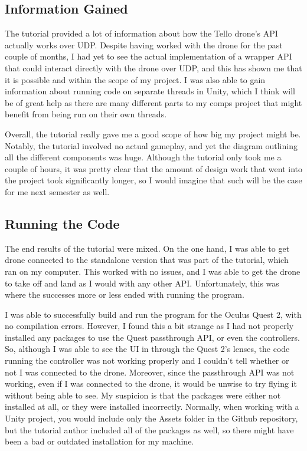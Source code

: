 \documentclass[10pt,twocolumn]{article}
\begin{document}
\subsection{Information Gained}
The tutorial provided a lot of information about how the Tello drone's API actually works over UDP. Despite having worked with the drone for the past couple of months, I had yet to see the actual implementation of a wrapper API that could interact directly with the drone over UDP, and this has shown me that it is possible and within the scope of my project. I was also able to gain information about running code on separate threads in Unity, which I think will be of great help as there are many different parts to my comps project that might benefit from being run on their own threads.

Overall, the tutorial really gave me a good scope of how big my project might be. Notably, the tutorial involved no actual gameplay, and yet the diagram outlining all the different components was huge. Although the tutorial only took me a couple of hours, it was pretty clear that the amount of design work that went into the project took significantly longer, so I would imagine that such will be the case for me next semester as well.

\subsection{Running the Code}
The end results of the tutorial were mixed. On the one hand, I was able to get drone connected to the standalone version that was part of the tutorial, which ran on my computer. This worked with no issues, and I was able to get the drone to take off and land as I would with any other API. Unfortunately, this was where the successes more or less ended with running the program.

I was able to successfully build and run the program for the Oculus Quest 2, with no compilation errors. However, I found this a bit strange as I had not properly installed any packages to use the Quest passthrough API, or even the controllers. So, although I was able to see the UI in through the Quest 2's lenses, the code running the controller was not working properly and I couldn't tell whether or not I was connected to the drone. Moreover, since the passthrough API was not working, even if I was connected to the drone, it would be unwise to try flying it without being able to see. My suspicion is that the packages were either not installed at all, or they were installed incorrectly. Normally, when working with a Unity project, you would include only the Assets folder in the Github repository, but the tutorial author included all of the packages as well, so there might have been a bad or outdated installation for my machine. 
\end{document}
